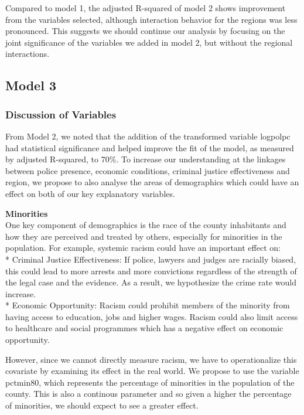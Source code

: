 \documentclass[]{article}
\begin{document}
Compared to model 1, the adjusted R-squared of model 2 shows improvement
from the variables selected, although interaction behavior for the
regions was less pronounced. This suggests we should continue our
analysis by focusing on the joint significance of the variables we added
in model 2, but without the regional interactions.

\hypertarget{model-3}{%
\subsection{Model 3}\label{model-3}}

\hypertarget{discussion-of-variables}{%
\subsubsection{Discussion of Variables}\label{discussion-of-variables}}

From Model 2, we noted that the addition of the transformed variable
logpolpc had statistical significance and helped improve the fit of the
model, as measured by adjusted R-squared, to 70\%. To increase our
understanding at the linkages between police presence, economic
conditions, criminal justice effectiveness and region, we propose to
also analyse the areas of demographics which could have an effect on
both of our key explanatory variables.

\textbf{Minorities}\\
One key component of demographics is the race of the county inhabitants
and how they are perceived and treated by others, especially for
minorities in the population. For example, systemic racism could have an
important effect on:\\
* Criminal Justice Effectiveness: If police, lawyers and judges are
racially biased, this could lead to more arrests and more convictions
regardless of the strength of the legal case and the evidence. As a
result, we hypothesize the crime rate would increase.\\
* Economic Opportunity: Racism could prohibit members of the minority
from having access to education, jobs and higher wages. Racism could
also limit access to healthcare and social programmes which has a
negative effect on economic opportunity.

However, since we cannot directly measure racism, we have to
operationalize this covariate by examining its effect in the real world.
We propose to use the variable pctmin80, which represents the percentage
of minorities in the population of the county. This is also a continous
parameter and so given a higher the percentage of minorities, we should
expect to see a greater effect.
\end{document}
